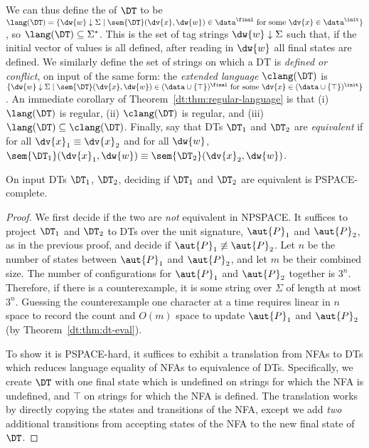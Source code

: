 We can thus define the  of $\DT$ to be $\lang(\DT) = \{\dw{w} \downarrow \Sigma \mid \sem{\DT}(\dv{x},\dw{w}) \in \data^\final \text{ for some } \dv{x} \in \data^\init\}$, so $\lang(\DT) \subseteq \Sigma^*$. This is the set of tag strings $\dw{w} \downarrow \Sigma$ such that, if the initial vector of values is all defined, after reading in $\dw{w}$ all final states are defined.
We similarly define the set of strings on which a DT is \emph{defined or conflict}, on input of the same form: the \emph{extended language} $\clang(\DT)$ is
$\{\dw{w} \downarrow \Sigma \mid \sem{\DT}(\dv{x},\dw{w}) \in (\data \cup \{\top\})^\final \text{ for some } \dv{x} \in (\data \cup \{\top\})^\init\}$.
An immediate corollary of Theorem~\ref{dt:thm:regular-language} is that
(i) $\lang(\DT)$ is regular, (ii) $\clang(\DT)$ is regular, and (iii) $\lang(\DT) \subseteq \clang(\DT)$.
Finally, say that DTs $\DT_1$ and $\DT_2$ are \emph{equivalent} if for all $\dv{x}_1 \equiv \dv{x}_2$ and
for all $\dw{w}$, $\sem{\DT_1}(\dv{x}_1,\dw{w}) \equiv \sem{\DT_2}(\dv{x}_2,\dw{w})$.

\begin{theorem}
\label{dt:thm:equivalence-pspace-complete}
On input DTs $\DT_1$, $\DT_2$,
deciding if $\DT_1$ and $\DT_2$ are equivalent is PSPACE-complete.
\end{theorem}
\begin{proof}
We first decide if the two are \emph{not} equivalent in NPSPACE.
It suffices to project $\DT_1$ and $\DT_2$ to DTs
over the unit signature, $\aut{P}_1$ and $\aut{P}_2$, as in the previous proof,
and decide if $\aut{P}_1 \not\equiv \aut{P}_2$.
Let $n$ be the number of states between $\aut{P}_1$ and $\aut{P}_2$,
and let $m$ be their combined size.
The number of configurations for $\aut{P}_1$ and $\aut{P}_2$ together is $3^n$.
Therefore, if there is a counterexample, it is some string over $\Sigma$ of length at most $3^n$.
Guessing the counterexample one character at a time
requires linear in $n$ space to record the count and $O(m)$ space to update
$\aut{P}_1$ and $\aut{P}_2$ (by Theorem~\ref{dt:thm:dt-eval}).

To show it is PSPACE-hard,
it suffices to exhibit a translation from NFAs to
DTs which reduces
language equality of NFAs to equivalence of DTs.
Specifically, we create $\DT$ with one final state
which is undefined on strings for which the NFA is undefined, and $\top$
on strings for which the NFA is defined.
The translation works by directly copying the states and transitions of the NFA, except we add \emph{two} additional transitions from accepting states of the NFA to the new final state of $\DT$.
\end{proof}

